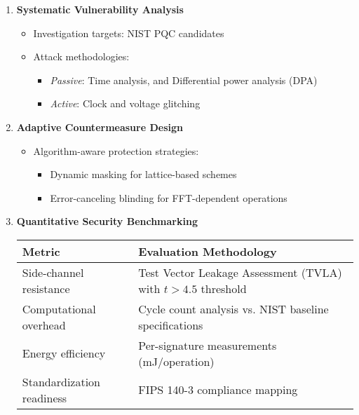 \documentclass[11pt, a4paper]{article}
\begin{document}
\begin{enumerate}[leftmargin=*, label=\textbf{\arabic*.}, series=main]
    \item \textbf{Systematic Vulnerability Analysis}
    \begin{itemize}[leftmargin=2em]
        \item Investigation targets: NIST PQC candidates
        \item Attack methodologies:
        \begin{itemize}
            \item \textit{Passive}: Time analysis, and Differential power analysis (DPA)
            \item \textit{Active}: Clock and voltage glitching
        \end{itemize}
    \end{itemize}
    
    \item \textbf{Adaptive Countermeasure Design}
    \begin{itemize}[leftmargin=2em]
        \item Algorithm-aware protection strategies:
        \begin{itemize}
            \item Dynamic masking for lattice-based schemes
            \item Error-canceling blinding for FFT-dependent operations
        \end{itemize}
    \end{itemize}
    
    \item \textbf{Quantitative Security Benchmarking}
    \begin{center}
    \begin{tabularx}{0.9\textwidth}{|l|X|}
        \toprule
        \rowcolor{gray!40} %
        \textbf{Metric} & \textbf{Evaluation Methodology} \\
        \midrule
        Side-channel resistance & Test Vector Leakage Assessment (TVLA) with $t > 4.5$ threshold \\
        Computational overhead & Cycle count analysis vs. NIST baseline specifications \\
        Energy efficiency & Per-signature measurements (mJ/operation) \\
        Standardization readiness & FIPS 140-3 compliance mapping \\
        \bottomrule
    \end{tabularx}
    \end{center}
\end{enumerate}
\end{document}
